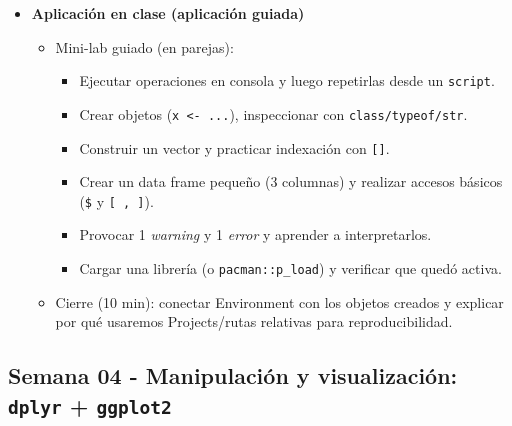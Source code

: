 \documentclass{article}
\begin{document}
\begin{itemize}
\item \textbf{Aplicación en clase (aplicación guiada)}
\begin{itemize}
  \item Mini-lab guiado (en parejas):
  \begin{itemize}
    \item Ejecutar operaciones en consola y luego repetirlas desde un \texttt{script}.
    \item Crear objetos (\texttt{x <- ...}), inspeccionar con \texttt{class/typeof/str}.
    \item Construir un vector y practicar indexación con \texttt{[]}.
    \item Crear un data frame pequeño (3 columnas) y realizar accesos básicos (\texttt{\$} y \texttt{[ , ]}).
    \item Provocar 1 \emph{warning} y 1 \emph{error} y aprender a interpretarlos.
    \item Cargar una librería (o \texttt{pacman::p\_load}) y verificar que quedó activa.
  \end{itemize}
  \item Cierre (10 min): conectar Environment con los objetos creados y explicar por qué usaremos Projects/rutas relativas para reproducibilidad.
\end{itemize}
\end{itemize}

\newpage
\subsection{Semana 04 - Manipulación y visualización: \texttt{dplyr} + \texttt{ggplot2}}
\vspace{0.2 cm}
\end{document}

